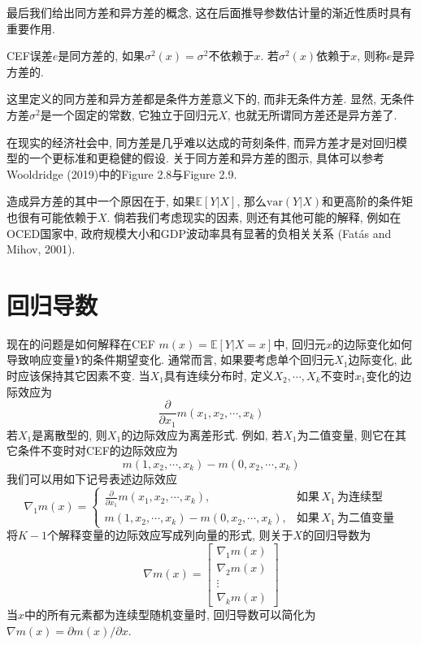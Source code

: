 \documentclass[cn, 12pt, math=mtpro2, bibstyle=apa, blue, twocol]{elegantbook}
\newcommand{\E}{\mathbb{E}}
\newcommand{\var}{\text{var}}
\begin{document}
最后我们给出同方差和异方差的概念, 这在后面推导参数估计量的渐近性质时具有重要作用.
\begin{definition}
CEF误差$e$是同方差的, 如果$\sigma^2(x)=\sigma^2$不依赖于$x$. 若$\sigma^2(x)$依赖于$x$, 则称$e$是异方差的.
\end{definition}
\begin{remark}
这里定义的同方差和异方差都是条件方差意义下的, 而非无条件方差. 显然, 无条件方差$\sigma^2$是一个固定的常数, 它独立于回归元$X$, 也就无所谓同方差还是异方差了.
\end{remark}
在现实的经济社会中, 同方差是几乎难以达成的苛刻条件, 而异方差才是对回归模型的一个更标准和更稳健的假设. 关于同方差和异方差的图示, 具体可以参考Wooldridge (2019)中的Figure 2.8与Figure 2.9.

造成异方差的其中一个原因在于, 如果$\E[Y|X]$, 那么$\var(Y|X)$和更高阶的条件矩也很有可能依赖于$X$. 倘若我们考虑现实的因素, 则还有其他可能的解释, 例如在OCED国家中, 政府规模大小和GDP波动率具有显著的负相关关系 (Fat\'{a}s and Mihov, 2001).

\section{回归导数}
现在的问题是如何解释在CEF $m(x)=\E[Y|X=x]$中, 回归元$x$的边际变化如何导致响应变量$Y$的条件期望变化. 通常而言, 如果要考虑单个回归元$X_1$边际变化, 此时应该保持其它因素不变. 当$X_1$具有连续分布时, 定义$X_2,\cdots,X_k$不变时$x_1$变化的边际效应为
$$\frac{\partial}{\partial x_1}m(x_1,x_2,\cdots,x_k)$$
若$X_1$是离散型的, 则$X_1$的边际效应为离差形式. 例如, 若$X_1$为二值变量, 则它在其它条件不变时对CEF的边际效应为
$$m(1,x_2,\cdots,x_k)-m(0,x_2,\cdots,x_k)$$
我们可以用如下记号表述边际效应
$$\nabla_1m(x)=\begin{cases}
                 \displaystyle\frac{\partial}{\partial x_1}m(x_1,x_2,\cdots,x_k), &\text{如果}\,X_1\,\text{为连续型} \\
                 m(1,x_2,\cdots,x_k)-m(0,x_2,\cdots,x_k), & \text{如果}\,X_1\,\text{为二值变量}
               \end{cases}$$
将$K-1$个解释变量的边际效应写成列向量的形式, 则关于$X$的回归导数为
$$\nabla m(x)=\begin{bmatrix}
           \nabla_1m(x) \\
           \nabla_2m(x) \\
           \vdots \\
           \nabla_km(x)
         \end{bmatrix}$$
当$x$中的所有元素都为连续型随机变量时, 回归导数可以简化为$\displaystyle\nabla m(x)=\partial m(x)/\partial x$.
\end{document}
